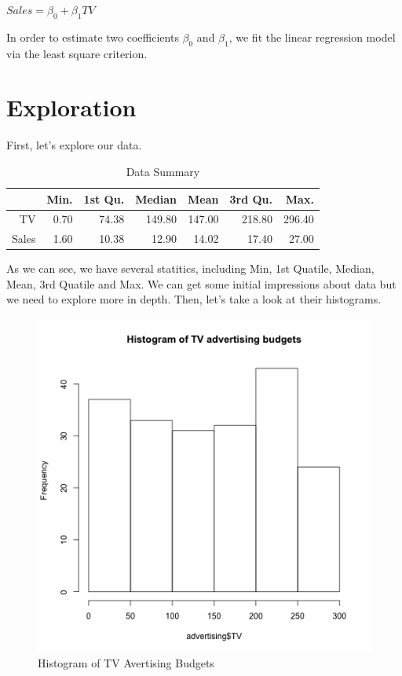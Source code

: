 \documentclass{article}
\begin{document}
\begin{center} 
$Sales = \beta_0 + \beta_1TV$ 
\end{center} 

\noindent
In order to estimate two coefficients $\beta_0$ and $\beta_1$, we fit the linear regression model via the least square criterion.

\section{Exploration}

First, let's explore our data.

\begin{table}[ht]
\centering
\begin{tabular}{rrrrrrr}
  \hline
 & Min. & 1st Qu. & Median & Mean & 3rd Qu. & Max. \\ 
  \hline
TV & 0.70 & 74.38 & 149.80 & 147.00 & 218.80 & 296.40 \\ 
  Sales & 1.60 & 10.38 & 12.90 & 14.02 & 17.40 & 27.00 \\ 
   \hline
\end{tabular}
\caption{Data Summary} 
\end{table}\noindent
As we can see, we have several statitics, including Min, 1st Quatile, Median, Mean, 3rd Quatile and Max. We can get some initial impressions about data but we need to explore more in depth. Then, let's take a look at their histograms. \newline


\begin{figure}[H]
\centering
\includegraphics{../images/histogram-tv.png}
\caption{\label{fig:TV} Histogram of TV Avertising Budgets}
\end{figure} 
\end{document}
